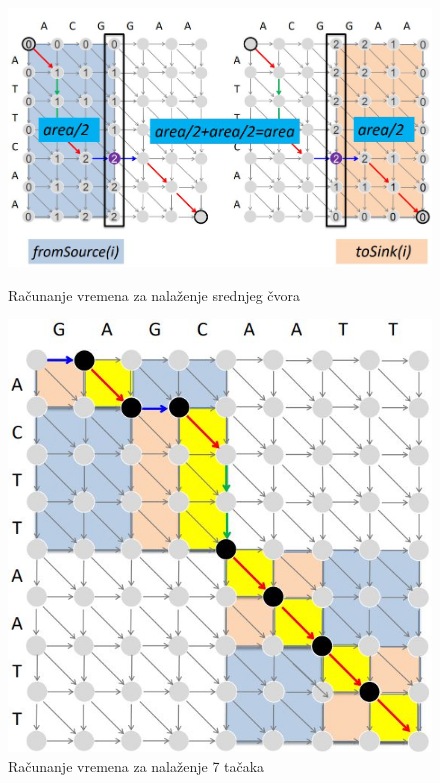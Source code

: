 \begin{figure}[H]
	\begin{minipage}{0.55\textwidth}
		\includegraphics[width=\linewidth]{poglavlja/5/slike/sourceSink.JPG}
		\caption{Računanje vremena za nalaženje srednjeg čvora}
		\label{slika:sourceSink}
	\end{minipage}
	\hfill
	\begin{minipage}{0.35\textwidth}
		\includegraphics[width=\linewidth]{poglavlja/5/slike/vremenskaSlozenostPPV.JPG}
		\caption{Računanje vremena za nalaženje 7 tačaka}
		\label{slika:vreme}
	\end{minipage}
\end{figure}


